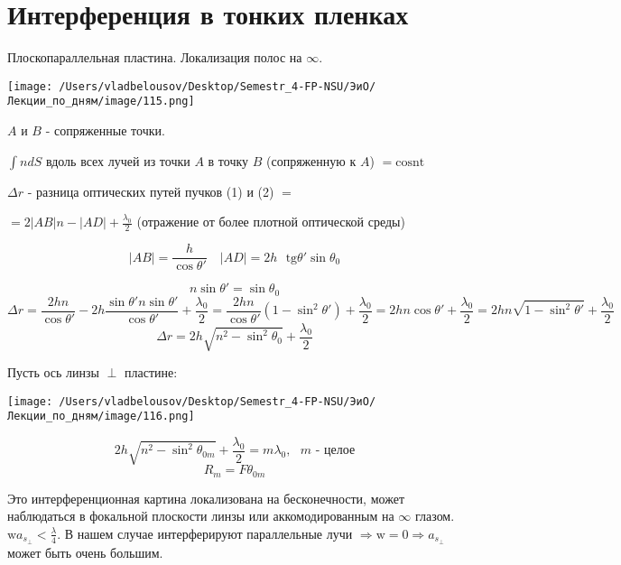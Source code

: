 \documentclass[12pt, a4paper]{report}
\begin{document}
\section{Интерференция в тонких пленках}

Плоскопараллельная пластина. Локализация полос на \( \infty  \). 

\begin{center}
    \texttt{[image: /Users/vladbelousov/Desktop/Semestr\_4-FP-NSU/ЭиО/Лекции\_по\_дням/image/115.png]}
\end{center}
\( A \) и \( B \) - сопряженные точки.

\( \int n d S  \) вдоль всех лучей из точки \( A \) в точку \( B \)  (сопряженную к \( A \)) \( = \mathrm{cosnt}   \) 

\( \Delta r  \)  - разница оптических путей пучков (1) и (2) \( = \) 

\( = 2 |AB|n - \displaystyle  |AD| + \frac{\lambda_0}{2}  \) (отражение от более плотной оптической среды)

\[ |AB | = \frac{h}{\cos \theta' } \quad  |AD| = 2 h \text{ } \mathrm{ tg}   \theta ' \sin  \theta_0 \]  

\[  n \sin \theta ' = \sin \theta_0  \] 
\[ \Delta r = \frac{2hn}{\cos \theta ' }- 2h \frac{\sin  \theta ' n \sin \theta ' }{\cos \theta ' }+ \frac{\lambda_0}{2 }  = \frac{2hn}{\cos  \theta' } (1 - \sin  ^2 \theta ' ) +\frac{\lambda_0}{2 }  = 2hn \cos \theta ' + \frac{\lambda_0}{2 }  = 2hn \sqrt{1 - \sin  ^2 \theta ' }   + \frac{\lambda_0}{2 }   \] 
\[ \Delta r = 2 h \sqrt{n ^2 - \sin  ^2 \theta_0 } + \frac{\lambda_0}{2 }  \] 

Пусть ось линзы \( \perp   \) пластине: 

\begin{center}
    \texttt{[image: /Users/vladbelousov/Desktop/Semestr\_4-FP-NSU/ЭиО/Лекции\_по\_дням/image/116.png]}
\end{center}



\[ 2 h \sqrt{n ^2 - \sin  ^2 \theta_{0m }  } + \frac{\lambda_0}{2 }  = m \lambda_0 , \text{ }  m \text{ - целое}  \] 
\[ R_m = F \theta_{0m}  \] 

Это интерференционная картина локализована на бесконечности, может наблюдаться в фокальной плоскости линзы или аккомодированным на \( \infty  \) глазом. \( \text{w} a_{s_{\perp } } < \displaystyle \frac{\lambda}{4}   \). В нашем случае интерферируют параллельные лучи \( \Rightarrow \text{w}= 0 \Rightarrow a_{s _{\perp  } }   \) может быть очень большим.
\end{document}
